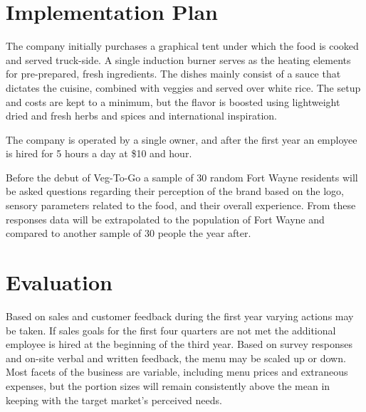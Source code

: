 \documentclass[12pt, letterpaper]{article}
\newcommand{\companyname}{Veg-To-Go}
\begin{document}
\section{Implementation Plan}
The company initially purchases a graphical tent under which the food is cooked and served truck-side.  A single induction burner serves as the heating elements for pre-prepared, fresh ingredients.  The dishes mainly consist of a sauce that dictates the cuisine, combined with veggies and served over white rice.  The setup and costs are kept to a minimum, but the flavor is boosted using lightweight dried and fresh herbs and spices and international inspiration.

The company is operated by a single owner, and after the first year an employee is hired for 5 hours a day at \$10 and hour.

Before the debut of \companyname{} a sample of 30 random Fort Wayne residents will be asked questions regarding their perception of the brand based on the logo, sensory parameters related to the food, and their overall experience.  From these responses data will be extrapolated to the population of Fort Wayne and compared to another sample of 30 people the year after.

\newpage

\section{Evaluation}
Based on sales and customer feedback during the first year varying actions may be taken.  If sales goals for the first four quarters are not met the additional employee is hired at the beginning of the third year. Based on survey responses and on-site verbal and written feedback, the menu may be scaled up or down.  Most facets of the business are variable, including menu prices and extraneous expenses, but the portion sizes will remain consistently above the mean in keeping with the target market's perceived needs.

\newpage
\end{document}
